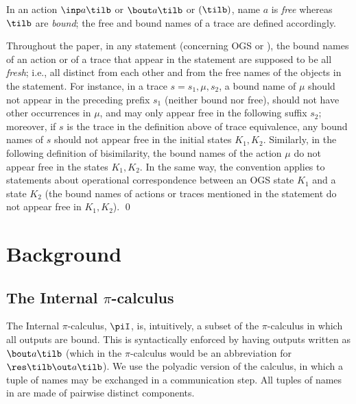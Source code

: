 \begin{remark}
\label{r:bn} 
In an action $\inp a \tilb$ or $\bout a \tilb$ or $(\tilb)$, 
name $a$ is \emph{free} whereas $\tilb$ are \emph{bound}; 
the free and bound names of a trace are defined accordingly.


Throughout the paper, 
in any statement (concerning OGS or \piI), the bound names of an action or of a trace that
appear in the statement are supposed to be all \emph{fresh}; i.e.,  
all distinct from each other and from the free names of the objects in the statement. 
For instance, in a  trace $s= s_1, \mu, s_2$, a  bound name of $\mu$ should not appear in the
preceding prefix  $s_1$
(neither bound nor free), should not have other occurrences  in $\mu$, 
and may only appear free in the following suffix  $s_2$; moreover, if  
$s$ is the trace 
in the definition above  of trace equivalence,  any  bound names  of
$s$ should not appear free in the initial states $K_1,K_2$.  
Similarly, in the following definition of bisimilarity, the bound names of the action $\mu$ do
not appear free in the states $K_1,K_2$. 
In the same way, the convention applies to statements about operational correspondence between an
OGS state $K_1$ and a \piI state $K_2$ (the bound names of actions or traces mentioned in
the statement do not appear free in  $K_1,K_2$).
\qed\end{remark}
\section{Background}
\label{s:back}

\subsection{The Internal $\pi$-calculus}
\label{ss:piI}

The Internal $\pi$-calculus, $\piI$, is, intuitively, 
a subset of the $\pi$-calculus 
in which all outputs are bound. This is syntactically enforced by
having outputs written as $\bout a\tilb$ (which in the $\pi$-calculus would be an
abbreviation for $\res\tilb \out a \tilb$). 
We use the polyadic version of the calculus, in which a tuple of names may be exchanged in
a communication step. 
All tuples of names in \piI 
are made of pairwise distinct components. 

